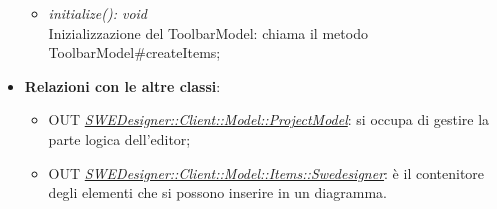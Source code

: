 \documentclass[../DefinizioneDiProdotto.tex]{subfiles}
\begin{document}
\begin{itemize}
\begin{itemize}
							\item \emph{initialize(): void} \\
							Inizializzazione del ToolbarModel: chiama il metodo ToolbarModel#createItems;
						\end{itemize}
						\item \textbf{Relazioni con le altre classi}:
						\begin{itemize}
							\item OUT \hyperlink{SWEDesigner::Client::Model::ProjectModel}{\emph{SWEDesigner::Client::Model::ProjectModel}}: si occupa di gestire la parte logica dell'editor;
							\item OUT \hyperlink{SWEDesigner::Client::Model::Items::Swedesigner}{\emph{SWEDesigner::Client::Model::Items::Swedesigner}}: è il contenitore degli elementi che si possono inserire in un diagramma.
						\end{itemize}
					\end{itemize}
\end{document}

